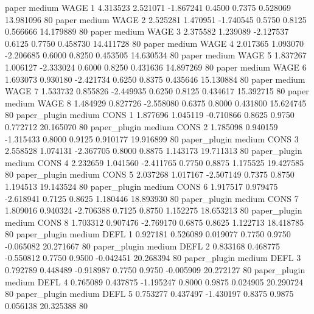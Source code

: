                  paper     medium     WAGE                 1  4.313523 2.521071 -1.867241 0.4500 0.7375  0.528069   13.981096 80
                 paper     medium     WAGE                 2  2.525281 1.470951 -1.740545 0.5750 0.8125  0.566666   14.179889 80
                 paper     medium     WAGE                 3  2.375582 1.239089 -2.127537 0.6125 0.7750  0.458730   14.411728 80
                 paper     medium     WAGE                 4  2.017365 1.093070 -2.206685 0.6000 0.8250  0.453505   14.630534 80
                 paper     medium     WAGE                 5  1.837267 1.006127 -2.333024 0.6000 0.8250  0.431636   14.897269 80
                 paper     medium     WAGE                 6  1.693073 0.930180 -2.421734 0.6250 0.8375  0.435646   15.130884 80
                 paper     medium     WAGE                 7  1.533732 0.855826 -2.449935 0.6250 0.8125  0.434617   15.392715 80
                 paper     medium     WAGE                 8  1.484929 0.827726 -2.558080 0.6375 0.8000  0.431800   15.624745 80
          paper_plugin     medium     CONS                 1  1.877696 1.045119 -0.710866 0.8625 0.9750  0.772712   20.165070 80
          paper_plugin     medium     CONS                 2  1.785098 0.940159 -1.315433 0.8000 0.9125  0.910177   19.916899 80
          paper_plugin     medium     CONS                 3  2.558528 1.074131 -2.367705 0.8000 0.8875  1.143173   19.711313 80
          paper_plugin     medium     CONS                 4  2.232659 1.041560 -2.411765 0.7750 0.8875  1.175525   19.427585 80
          paper_plugin     medium     CONS                 5  2.037268 1.017167 -2.507149 0.7375 0.8750  1.194513   19.143524 80
          paper_plugin     medium     CONS                 6  1.917517 0.979475 -2.618941 0.7125 0.8625  1.180446   18.893930 80
          paper_plugin     medium     CONS                 7  1.809016 0.940324 -2.706388 0.7125 0.8750  1.152275   18.653213 80
          paper_plugin     medium     CONS                 8  1.703312 0.907476 -2.769170 0.6875 0.8625  1.122713   18.418785 80
          paper_plugin     medium     DEFL                 1  0.927181 0.526089  0.019077 0.7750 0.9750 -0.065082   20.271667 80
          paper_plugin     medium     DEFL                 2  0.833168 0.468775 -0.550812 0.7750 0.9500 -0.042451   20.268394 80
          paper_plugin     medium     DEFL                 3  0.792789 0.448489 -0.918987 0.7750 0.9750 -0.005909   20.272127 80
          paper_plugin     medium     DEFL                 4  0.765089 0.437875 -1.195247 0.8000 0.9875  0.024905   20.290724 80
          paper_plugin     medium     DEFL                 5  0.753277 0.437497 -1.430197 0.8375 0.9875  0.056138   20.325388 80
